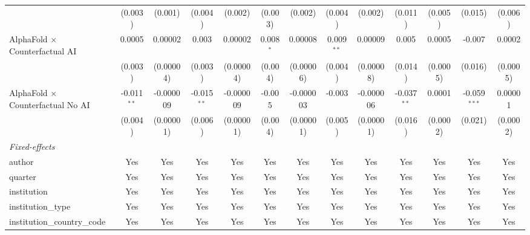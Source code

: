 \begin{tabular}{lcccccccccccc}
                                            & (0.003)       & (0.001)       & (0.004)       & (0.002)       & (0.003)        & (0.002)       & (0.004)        & (0.002)       & (0.011)       & (0.005)  & (0.015)        & (0.006)\\   
   AlphaFold $\times$ Counterfactual AI     & 0.0005        & 0.00002       & 0.003         & 0.00002       & 0.008$^{*}$    & 0.00008       & 0.009$^{**}$   & 0.00009       & 0.005         & 0.0005   & -0.007         & 0.0002\\   
                                            & (0.003)       & (0.00004)     & (0.003)       & (0.00004)     & (0.004)        & (0.00006)     & (0.004)        & (0.00008)     & (0.014)       & (0.0005) & (0.016)        & (0.0005)\\   
   AlphaFold $\times$ Counterfactual No AI  & -0.011$^{**}$ & -0.000009     & -0.015$^{**}$ & -0.000009     & -0.005         & -0.000003     & -0.003         & -0.000006     & -0.037$^{**}$ & 0.0001   & -0.059$^{***}$ & 0.00001\\   
                                            & (0.004)       & (0.00001)     & (0.006)       & (0.00001)     & (0.004)        & (0.00001)     & (0.005)        & (0.00001)     & (0.016)       & (0.0002) & (0.021)        & (0.0002)\\   
   \midrule
   \emph{Fixed-effects}\\
   author                                   & Yes           & Yes           & Yes           & Yes           & Yes            & Yes           & Yes            & Yes           & Yes           & Yes      & Yes            & Yes\\  
   quarter                                  & Yes           & Yes           & Yes           & Yes           & Yes            & Yes           & Yes            & Yes           & Yes           & Yes      & Yes            & Yes\\  
   institution                              & Yes           & Yes           & Yes           & Yes           & Yes            & Yes           & Yes            & Yes           & Yes           & Yes      & Yes            & Yes\\  
   institution\_type                        & Yes           & Yes           & Yes           & Yes           & Yes            & Yes           & Yes            & Yes           & Yes           & Yes      & Yes            & Yes\\  
   institution\_country\_code               & Yes           & Yes           & Yes           & Yes           & Yes            & Yes           & Yes            & Yes           & Yes           & Yes      & Yes            & Yes\\  

\end{tabular}
